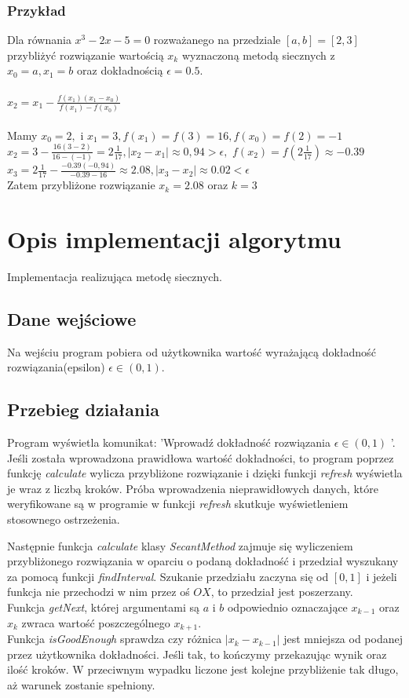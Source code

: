 \documentclass[12pt]{article}
\begin{document}
\subsubsection{Przykład}
Dla równania $x^3-2x-5=0$ rozważanego na przedziale $[a,b]=[2,3]$ przybliżyć rozwiązanie wartością $x_k$ wyznaczoną metodą siecznych z\\
$x_0=a, x_1=b$ oraz dokładnością $\epsilon = 0.5.$
\\ \\
$ x_2=x_1 - \frac{f(x_1)(x_1-x_{0})}{f(x_1)-f(x_{0})}$
\\ \\
 Mamy $ x_{0}=2,$ i $x_{1}=3, f(x_1)=f(3)=16, f(x_0)=f(2)=-1$
\\$x_2=3-\frac{16(3-2)}{16-(-1)}=2 \frac{1}{17}, |x_2 - x_1|\approx 0,94 > \epsilon,$
$f(x_2)=f(2 \frac{1}{17})\approx-0.39$ $x_3=2 \frac{1}{17}-\frac{-0.39(-0,94)}{-0.39-16}\approx2.08, |x_3 - x_2|\approx 0.02<\epsilon$
\\Zatem przybliżone rozwiązanie $x_k=2.08$ oraz $k=3$
\section{Opis implementacji algorytmu}
Implementacja realizująca metodę siecznych.
\subsection{Dane wejściowe}
Na wejściu program pobiera od użytkownika wartość wyrażającą dokładność rozwiązania(epsilon) $\epsilon \in(0,1).$



\subsection{Przebieg działania}
Program wyświetla komunikat: 'Wprowadź dokładność rozwiązania $\epsilon \in(0,1)$ '. Jeśli została wprowadzona prawidłowa wartość dokładności, to program poprzez funkcję \emph{calculate} wylicza przybliżone rozwiązanie i dzięki funkcji \emph{refresh} wyświetla je wraz z liczbą kroków.
Próba wprowadzenia nieprawidłowych danych, które weryfikowane są w programie w funkcji \emph{refresh} skutkuje wyświetleniem stosownego ostrzeżenia.
\par Następnie funkcja \emph{calculate} klasy \emph{SecantMethod} zajmuje się wyliczeniem przybliżonego rozwiązania w oparciu o podaną dokładność i przedział wyszukany za pomocą funkcji \emph{findInterval}. Szukanie przedziału zaczyna się od $[0, 1]$ i jeżeli funkcja nie przechodzi w nim przez oś $OX$, to przedział jest poszerzany.\\
Funkcja \emph{getNext}, której argumentami są $a$ i $b$ odpowiednio oznaczające $x_{k-1}$ oraz $x_{k}$ zwraca wartość poszczególnego $x_{k+1}$.
\\
Funkcja \emph{isGoodEnough} sprawdza czy różnica  $|x_k - x_{k-1}|$ jest mniejsza od podanej przez użytkownika dokładności. Jeśli tak, to kończymy przekazując wynik oraz ilość kroków. W przeciwnym wypadku liczone jest kolejne przybliżenie tak długo, aż warunek zostanie spełniony.
\end{document}
